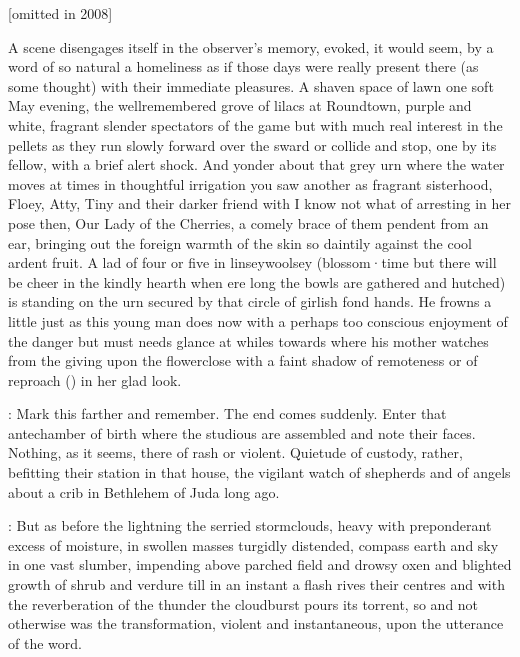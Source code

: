 [omitted in 2008]

A scene disengages itself in the observer's memory,
evoked,
it would seem,
by a word of so natural a homeliness as if those days were really present there
(as some thought)
with their immediate pleasures.
A shaven space of lawn one soft
May evening,
the wellremembered grove of lilacs at Roundtown,
purple and
white,
fragrant slender spectators of the game but with much real
interest in the pellets as they run slowly forward over the sward or
collide and stop,
one by its fellow,
with a brief alert shock.
And yonder
about that grey urn where the water moves at times in thoughtful
irrigation you saw another as fragrant sisterhood,
Floey,
Atty,
Tiny and
their darker friend with I know not what of arresting in her pose then,
Our Lady of the Cherries,
a comely brace of them pendent from an ear,
bringing out the foreign warmth of the skin so daintily against the cool ardent fruit.
A lad of four or five in linseywoolsey
(blossom·time but there will be cheer in the kindly hearth when ere long the bowls are gathered and hutched)
is standing on the urn secured by that circle of girlish fond hands.
He frowns a little just as this young man does now
with a perhaps too conscious enjoyment of the danger but must needs
glance at whiles towards where his mother watches
from the  giving upon the flowerclose
with a faint shadow of remoteness or of reproach
() in her glad look.


:
Mark this farther and remember.
The end comes suddenly.
Enter that antechamber of birth where the studious are assembled
and note their faces.
Nothing,
as it seems,
there of rash or violent.
Quietude of
custody,
rather,
befitting their station in that house,
the vigilant
watch of shepherds and of angels about a crib in Bethlehem of Juda long
ago.

:
But as before the lightning the serried stormclouds,
heavy with
preponderant excess of moisture,
in swollen masses turgidly distended,
compass earth and sky in one vast slumber,
impending above parched field
and drowsy oxen and blighted growth of shrub and verdure till in an
instant a flash rives their centres and with the reverberation of the
thunder the cloudburst pours its torrent,
so and not otherwise was the
transformation,
violent and instantaneous,
upon the utterance of the word.


